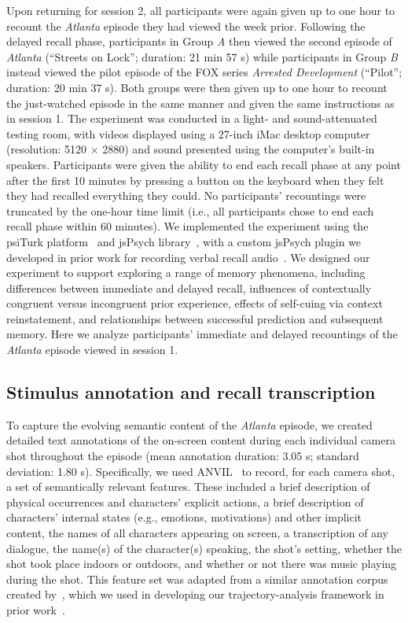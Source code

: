 \documentclass[10pt]{article}
\begin{document}
Upon returning for session 2, all participants were again given up to one hour to recount the \textit{Atlanta} episode they had viewed the week prior.
Following the delayed recall phase, participants in Group \textit{A} then viewed the second episode of \textit{Atlanta} (``Streets on Lock''; duration: 21 min 57 s) while participants in Group \textit{B} instead viewed the pilot episode of the FOX series \textit{Arrested Development} (``Pilot''; duration: 20 min 37 s).
Both groups were then given up to one hour to recount the just-watched episode in the same manner and given the same instructions as in session 1.
The experiment was conducted in a light- and sound-attenuated testing room, with videos displayed using a 27-inch iMac desktop computer (resolution: 5120 $\times$ 2880) and sound presented using the computer's built-in speakers.
Participants were given the ability to end each recall phase at any point after the first 10 minutes by pressing a button on the keyboard when they felt they had recalled everything they could.
No participants' recountings were truncated by the one-hour time limit (i.e., all participants chose to end each recall phase within 60 minutes). 
We implemented the experiment using the psiTurk platform~\citep{GureEtal16} and jsPsych library~\citep{deLe15}, with a custom jsPsych plugin we developed in prior work for recording verbal recall audio~\citep{ZimaEtal18}.
We designed our experiment to support exploring a range of memory phenomena, including differences between immediate and delayed recall, influences of contextually congruent versus incongruent prior experience, effects of self-cuing via context reinstatement, and relationships between successful prediction and subsequent memory.
Here we analyze participants' immediate and delayed recountings of the \textit{Atlanta} episode viewed in session 1.


\subsection*{Stimulus annotation and recall transcription}\label{subsec:annotations-transcripts}

To capture the evolving semantic content of the \textit{Atlanta} episode, we created detailed text annotations of the on-screen content during each individual camera shot throughout the episode (mean annotation duration: 3.05 s; standard deviation: 1.80 s).
Specifically, we used ANVIL~\citep{Kipp01} to record, for each camera shot, a set of semantically relevant features. These included a brief description of physical occurrences and characters' explicit actions, a brief description of characters' internal states (e.g., emotions, motivations) and other implicit content, the names of all characters appearing on screen, a transcription of any dialogue, the name(s) of the character(s) speaking, the shot's setting, whether the shot took place indoors or outdoors, and whether or not there was music playing during the shot.
This feature set was adapted from a similar annotation corpus created by~\cite{ChenEtal17}, which we used in developing our trajectory-analysis framework in prior work~\citep{HeusEtal21}.
\end{document}
